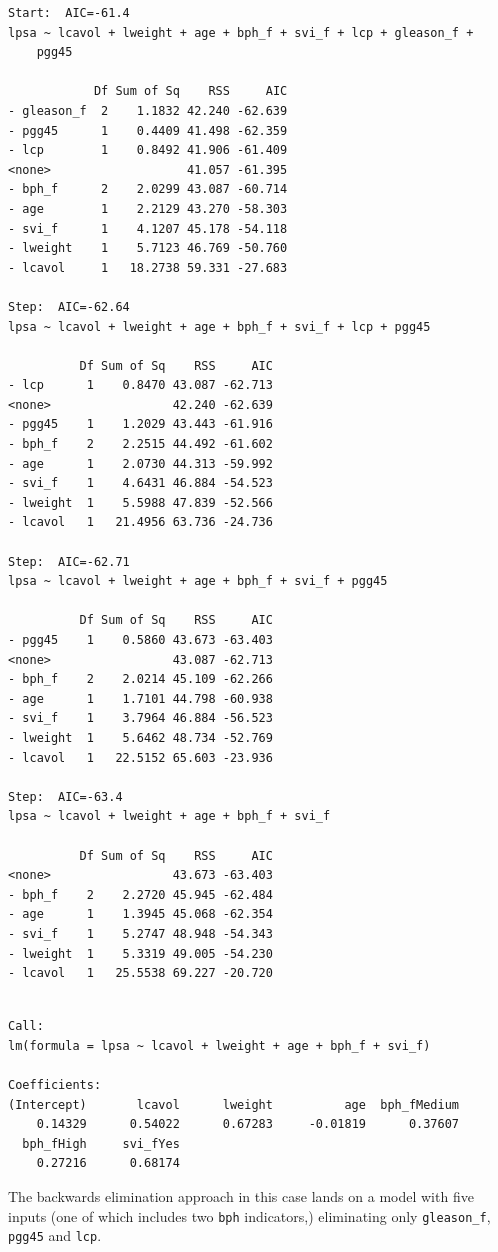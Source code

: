 \documentclass[]{book}
\theoremstyle{definition}
\theoremstyle{definition}
\theoremstyle{definition}
\theoremstyle{remark}
\begin{document}
\begin{verbatim}
Start:  AIC=-61.4
lpsa ~ lcavol + lweight + age + bph_f + svi_f + lcp + gleason_f + 
    pgg45

            Df Sum of Sq    RSS     AIC
- gleason_f  2    1.1832 42.240 -62.639
- pgg45      1    0.4409 41.498 -62.359
- lcp        1    0.8492 41.906 -61.409
<none>                   41.057 -61.395
- bph_f      2    2.0299 43.087 -60.714
- age        1    2.2129 43.270 -58.303
- svi_f      1    4.1207 45.178 -54.118
- lweight    1    5.7123 46.769 -50.760
- lcavol     1   18.2738 59.331 -27.683

Step:  AIC=-62.64
lpsa ~ lcavol + lweight + age + bph_f + svi_f + lcp + pgg45

          Df Sum of Sq    RSS     AIC
- lcp      1    0.8470 43.087 -62.713
<none>                 42.240 -62.639
- pgg45    1    1.2029 43.443 -61.916
- bph_f    2    2.2515 44.492 -61.602
- age      1    2.0730 44.313 -59.992
- svi_f    1    4.6431 46.884 -54.523
- lweight  1    5.5988 47.839 -52.566
- lcavol   1   21.4956 63.736 -24.736

Step:  AIC=-62.71
lpsa ~ lcavol + lweight + age + bph_f + svi_f + pgg45

          Df Sum of Sq    RSS     AIC
- pgg45    1    0.5860 43.673 -63.403
<none>                 43.087 -62.713
- bph_f    2    2.0214 45.109 -62.266
- age      1    1.7101 44.798 -60.938
- svi_f    1    3.7964 46.884 -56.523
- lweight  1    5.6462 48.734 -52.769
- lcavol   1   22.5152 65.603 -23.936

Step:  AIC=-63.4
lpsa ~ lcavol + lweight + age + bph_f + svi_f

          Df Sum of Sq    RSS     AIC
<none>                 43.673 -63.403
- bph_f    2    2.2720 45.945 -62.484
- age      1    1.3945 45.068 -62.354
- svi_f    1    5.2747 48.948 -54.343
- lweight  1    5.3319 49.005 -54.230
- lcavol   1   25.5538 69.227 -20.720
\end{verbatim}

\begin{verbatim}

Call:
lm(formula = lpsa ~ lcavol + lweight + age + bph_f + svi_f)

Coefficients:
(Intercept)       lcavol      lweight          age  bph_fMedium  
    0.14329      0.54022      0.67283     -0.01819      0.37607  
  bph_fHigh     svi_fYes  
    0.27216      0.68174  
\end{verbatim}

The backwards elimination approach in this case lands on a model with
five inputs (one of which includes two \texttt{bph} indicators,)
eliminating only \texttt{gleason\_f}, \texttt{pgg45} and \texttt{lcp}.
\end{document}
